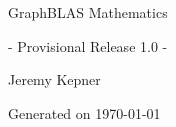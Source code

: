
  \begin{titlepage}

    \begin{adjustwidth}{-0.75in}{0in}
    \begin{center}
      \Huge
      GraphBLAS Mathematics
      
      - Provisional Release 1.0 -

      \vspace{0.5in}\textsf{}\vspace{-0.7in}
      \normalsize

      \vspace{1.0in}

      Jeremy Kepner
      
      \vspace{0.5in}
      
      Generated on \today
      

    \vspace{3.5in}

    \end{center}
    \end{adjustwidth}

  \end{titlepage}



